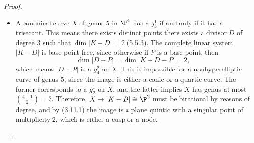 \documentclass[a4paper]{article}
\begin{document}
\begin{enumerate} [label=\textbf{\arabic*.}, leftmargin=0em]
\begin{proof}
\begin{itemize} [leftmargin=0cm]
            \item[(b)] A canonical curve $X$ of genus 5 in $\P^4$ has a $g^1_3$ if and only if it has a trisecant.
                  This means there exists distinct points there exists a divisor $D$ of degree 3 such that $\dim |K - D| = 2$ (5.5.3).
                  The complete linear system $|K - D|$ is base-point free, since otherwise if $P$ is a base-point, then $$\dim |D + P| = \dim |K - D - P| = 2,$$
                  which means $|D + P|$ is a $g^2_4$ on $X$.
                  This is impossible for a nonhyperelliptic curve of genus 5, since the image is either a conic or a quartic curve.
                  The former corresponds to a $g^1_2$ on $X$, and the latter implies $X$ has genus at most $\binom{4 - 1}{2} = 3$.
                  Therefore, $X \to |K - D| \cong \P^2$ must be birational by reasons of degree, and by (3.11.1) the image is a plane quintic with a singular point of multiplicity 2, which is either a cusp or a node.


\end{itemize}
\end{proof}
\end{enumerate}
\end{document}
